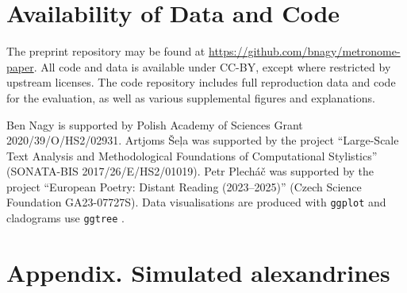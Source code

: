 \documentclass[
    hf
]{ceurart}
\begin{document}
\section{Availability of Data and Code}\label{sec:data}

The preprint repository may be found at \url{https://github.com/bnagy/metronome-paper}. All code
and data is available under CC-BY, except where restricted by upstream licenses.
The code repository includes full reproduction data and code for the evaluation,
as well as various supplemental figures and explanations.

\FloatBarrier

\begin{acknowledgments}
    Ben Nagy is supported by Polish Academy of Sciences Grant 2020/39/O/HS2/02931. Artjoms Šeļa was supported by
    the project “Large-Scale Text Analysis and Methodological Foundations of Computational Stylistics” (SONATA-BIS
    2017/26/E/HS2/01019). Petr Plecháč was supported by the project “European Poetry: Distant Reading (2023--2025)”
    (Czech Science Foundation GA23-07727S). Data visualisations are produced with \texttt{ggplot} \cite{ggplot} and
    cladograms use \texttt{ggtree} \cite{ggtree}.
\end{acknowledgments}

\printbibliography
\FloatBarrier

\appendix
\section*{Appendix. Simulated alexandrines}\label{sec:appendix}
\end{document}
